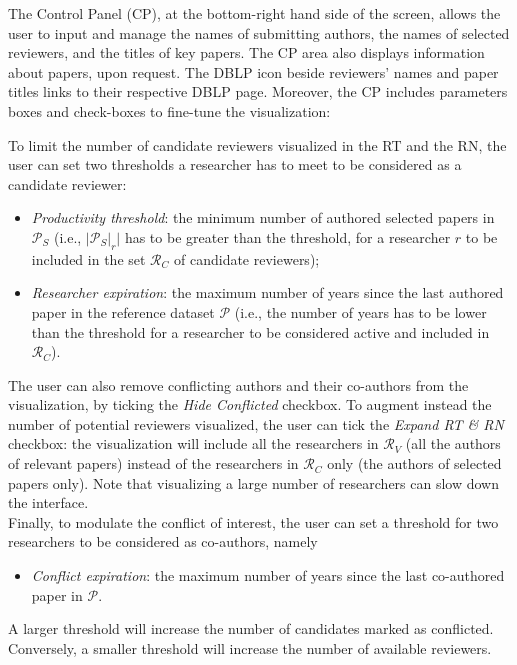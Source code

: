 The Control Panel (CP), at the bottom-right hand side of the screen, allows the user to input and manage the names of submitting authors, the names of selected reviewers, and the titles of key papers. The CP area also displays information about papers, upon request. The DBLP icon beside reviewers' names and paper titles links to their respective DBLP page. Moreover, the CP includes parameters boxes and check-boxes to fine-tune the visualization:

To limit the number of candidate reviewers visualized in the RT and the RN, the user can set two thresholds a researcher has to meet to be considered as a candidate reviewer: 
\begin{itemize}
\item \emph{Productivity threshold}: the minimum number of authored selected papers in $\mathcal{P}_S$ (i.e., $\vert \mathcal{P}_{S}|_{r} \vert$ has to be greater than the threshold, for a researcher $r$ to be included in the set $\mathcal{R}_C$ of candidate reviewers);
\item \emph{Researcher expiration}: the maximum number of years since the last authored paper in the reference dataset $\mathcal{P}$ (i.e., the number of years has to be lower than the threshold for a researcher to be considered active and included in $\mathcal{R}_C$).
\end{itemize}
The user can also remove conflicting authors and their co-authors from the visualization, by ticking the \emph{Hide Conflicted} checkbox.
To augment instead the number of potential reviewers visualized, the user can tick the \emph{Expand RT \& RN} checkbox: the visualization will include all the researchers in $\mathcal{R}_V$ (all the authors of relevant papers) instead of the researchers in $\mathcal{R}_C$ only (the authors of selected papers only). Note that visualizing a large number of researchers can slow down the interface. \\

Finally, to modulate the conflict of interest, the user can set a threshold for two researchers to be considered as co-authors, namely 
\begin{itemize}
\item \emph{Conflict expiration}: the maximum number of years since the last co-authored paper in $\mathcal{P}$. 
\end{itemize}
A larger threshold will increase the number of candidates marked as conflicted. Conversely, a smaller threshold will increase the number of available reviewers. 

